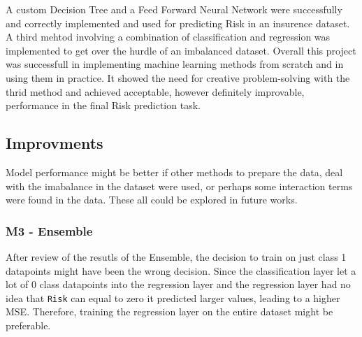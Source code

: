 A custom Decision Tree and a Feed Forward Neural Network were successfully and correctly implemented and used for predicting Risk in an insurence dataset. A third mehtod involving a combination of classification and regression was implemented to get over the hurdle of an imbalanced dataset. Overall this project was successfull in implementing machine learning methods from scratch and in using them in practice. It showed the need for creative problem-solving with the thrid method and achieved acceptable, however definitely improvable, performance in the final Risk prediction task. 

\subsection{Improvments}
Model performance might be better if other methods to prepare the data, deal with the imabalance in the dataset were used, or perhaps some interaction terms were found in the data. These all could be explored in future works.

\subsubsection{M3 - Ensemble}
After review of the resutls of the Ensemble, the decision to train on just class 1 datapoints might have been the wrong decision. Since the classification layer let a lot of 0 class datapoints into the regression layer and the regression layer had no idea that \texttt{Risk} can equal to zero it predicted larger values, leading to a higher MSE. Therefore, training the regression layer on the entire dataset might be preferable. 